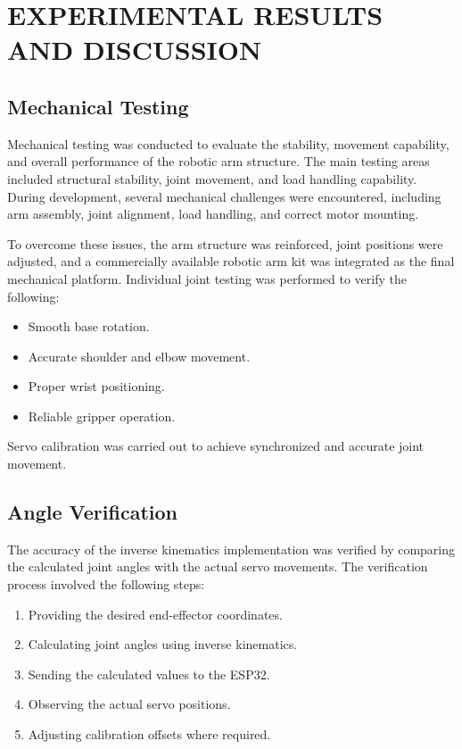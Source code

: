 \section{EXPERIMENTAL RESULTS AND DISCUSSION}

\subsection{Mechanical Testing}

Mechanical testing was conducted to evaluate the stability, movement capability, and overall performance of the robotic arm structure. The main testing areas included structural stability, joint movement, and load handling capability. During development, several mechanical challenges were encountered, including arm assembly, joint alignment, load handling, and correct motor mounting.

To overcome these issues, the arm structure was reinforced, joint positions were adjusted, and a commercially available robotic arm kit was integrated as the final mechanical platform. Individual joint testing was performed to verify the following:

\begin{itemize}
    \item Smooth base rotation.
    \item Accurate shoulder and elbow movement.
    \item Proper wrist positioning.
    \item Reliable gripper operation.
\end{itemize}

Servo calibration was carried out to achieve synchronized and accurate joint movement.

\subsection{Angle Verification}

The accuracy of the inverse kinematics implementation was verified by comparing the calculated joint angles with the actual servo movements. The verification process involved the following steps:

\begin{enumerate}
    \item Providing the desired end-effector coordinates.
    \item Calculating joint angles using inverse kinematics.
    \item Sending the calculated values to the ESP32.
    \item Observing the actual servo positions.
    \item Adjusting calibration offsets where required.
\end{enumerate}

